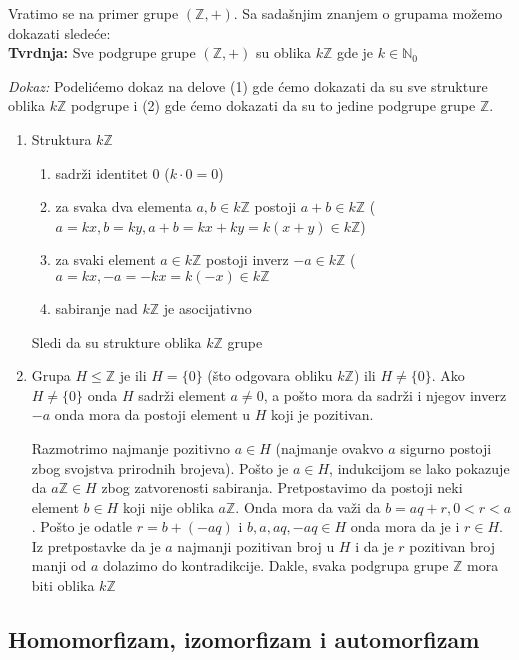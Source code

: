 \documentclass{article}
\begin{document}
Vratimo se na primer grupe $(\mathbb{Z}, +)$. Sa sadašnjim znanjem o grupama možemo dokazati sledeće: \\

\textbf{Tvrdnja:} Sve podgrupe grupe $(\mathbb{Z}, +)$ su oblika $k\mathbb{Z}$ gde je $k \in \mathbb{N}_0$

\textit{Dokaz:} Podelićemo dokaz na delove (1) gde ćemo dokazati da su sve strukture oblika $k\mathbb{Z}$ podgrupe i (2) gde ćemo dokazati da su to jedine podgrupe grupe $\mathbb{Z}$.

\begin{enumerate}
    \item Struktura $k\mathbb{Z}$
    \begin{enumerate}
        \item sadrži identitet 0 ($k \cdot 0 = 0$)
        \item za svaka dva elementa $a, b \in k\mathbb{Z}$ postoji $a + b \in k\mathbb{Z}$ ($a = kx, b = ky, a+b = kx + ky = k(x + y) \in k\mathbb{Z}$)
        \item za svaki element $a \in k\mathbb{Z}$ postoji inverz $-a \in k\mathbb{Z}$ ($a = kx, -a = -kx = k(-x) \in k\mathbb{Z}$
        \item sabiranje nad $k\mathbb{Z}$ je asocijativno
    \end{enumerate}
    Sledi da su strukture oblika $k\mathbb{Z}$ grupe
    
    \item Grupa $H \leq \mathbb{Z}$ je ili $H = \{0\}$ (što odgovara obliku $k\mathbb{Z}$) ili $H \neq \{0\}$. Ako $H \neq \{0\}$ onda $H$ sadrži element $a \neq 0$, a pošto mora da sadrži i njegov inverz $-a$ onda mora da postoji element u $H$ koji je pozitivan.
    
    Razmotrimo najmanje pozitivno $a \in H$ (najmanje ovakvo $a$ sigurno postoji zbog svojstva prirodnih brojeva). Pošto je $a \in H$, indukcijom se lako pokazuje da $a\mathbb{Z} \in H$ zbog zatvorenosti sabiranja. Pretpostavimo da postoji neki element $b \in H$ koji nije oblika $a\mathbb{Z}$. Onda mora da važi da $b = aq+r, 0 < r < a$. Pošto je odatle $r = b + (-aq)$ i $b, a, aq, -aq\in H$ onda mora da je i $r \in H$. Iz pretpostavke da je $a$ najmanji pozitivan broj u $H$ i da je $r$ pozitivan broj manji od $a$ dolazimo do kontradikcije. Dakle, svaka podgrupa grupe $\mathbb{Z}$ mora biti oblika $k\mathbb{Z}$ 
\end{enumerate}

\subsection{Homomorfizam, izomorfizam i automorfizam}
\end{document}
